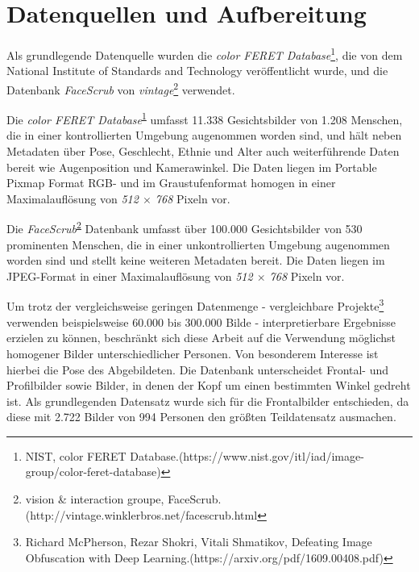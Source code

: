 \section{Datenquellen und Aufbereitung}

Als grundlegende Datenquelle wurden die
\textit{color FERET Database}\footnote{NIST, color FERET Database.\newline(https://www.nist.gov/itl/iad/image-group/color-feret-database)\label{footnote:color-feret}},
die von dem National Institute of Standards and Technology veröffentlicht wurde, und die
Datenbank \textit{FaceScrub} von \textit{vintage}\footnote{vision \& interaction groupe, FaceScrub.\newline(http://vintage.winklerbros.net/facescrub.html\label{footnote:face-scrub}} verwendet.

Die \textit{color FERET Database}\textsuperscript{\ref{footnote:color-feret}} umfasst 11.338 Gesichtsbilder von 1.208 Menschen, die in einer kontrollierten Umgebung augenommen worden sind, und
hält neben Metadaten über Pose, Geschlecht, Ethnie und Alter auch weiterführende Daten bereit wie Augenposition und
Kamerawinkel. Die Daten liegen im Portable Pixmap Format RGB- und im Graustufenformat homogen in einer Maximalauflösung von \textit{512 \(\times\) 768} Pixeln vor.

Die \textit{FaceScrub}\textsuperscript{\ref{footnote:face-scrub}} Datenbank umfasst über 100.000 Gesichtsbilder von 530 prominenten Menschen, die in einer unkontrollierten Umgebung augenommen worden sind und stellt keine
weiteren Metadaten bereit. Die Daten liegen im JPEG-Format in einer Maximalauflösung von \textit{512 \(\times\) 768} Pixeln vor.


Um trotz der vergleichsweise geringen Datenmenge - vergleichbare Projekte\footnote{Richard McPherson, Rezar Shokri, Vitali Shmatikov, Defeating Image Obfuscation with Deep Learning.\newline(https://arxiv.org/pdf/1609.00408.pdf)}
verwenden beispielsweise 60.000 bis 300.000 Bilde - interpretierbare Ergebnisse erzielen zu können, beschränkt sich diese Arbeit auf
die Verwendung möglichst homogener Bilder unterschiedlicher Personen. Von besonderem Interesse ist hierbei die Pose des
Abgebildeten. Die Datenbank unterscheidet Frontal- und Profilbilder sowie Bilder, in denen der Kopf um einen bestimmten
Winkel gedreht ist. Als grundlegenden Datensatz wurde sich für die Frontalbilder entschieden, da diese mit 2.722 Bilder
von 994 Personen den größten Teildatensatz ausmachen.

